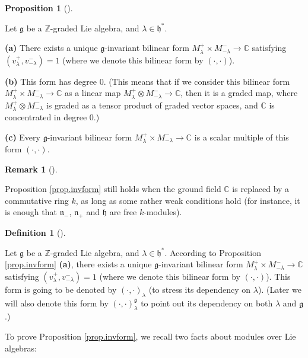 \documentclass
[numbers=enddot,12pt,final,onecolumn,german,notitlepage]{scrartcl}%
\theoremstyle{definition}
\newtheorem{prop}[theo]{Proposition}
\newenvironment{proposition}[1][]
{\begin{prop}[#1]\begin{leftbar}}
{\end{leftbar}\end{prop}}
\newtheorem{defi}[theo]{Definition}
\newenvironment{definition}[1][]
{\begin{defi}[#1]\begin{leftbar}}
{\end{leftbar}\end{defi}}
\newtheorem{remk}[theo]{Remark}
\newenvironment{remark}[1][]
{\begin{remk}[#1]\begin{leftbar}}
{\end{leftbar}\end{remk}}
\begin{document}
\begin{proposition}
\label{prop.invform}Let $\mathfrak{g}$ be a $\mathbb{Z}$-graded Lie algebra,
and $\lambda\in\mathfrak{h}^{\ast}$.

\textbf{(a)} There exists a unique $\mathfrak{g}$-invariant bilinear form
$M_{\lambda}^{+}\times M_{-\lambda}^{-}\rightarrow\mathbb{C}$ satisfying
$\left(  v_{\lambda}^{+},v_{-\lambda}^{-}\right)  =1$ (where we denote this
bilinear form by $\left(  \cdot,\cdot\right)  $).

\textbf{(b)} This form has degree $0$. (This means that if we consider this
bilinear form $M_{\lambda}^{+}\times M_{-\lambda}^{-}\rightarrow\mathbb{C}$ as
a linear map $M_{\lambda}^{+}\otimes M_{-\lambda}^{-}\rightarrow\mathbb{C}$,
then it is a graded map, where $M_{\lambda}^{+}\otimes M_{-\lambda}^{-}$ is
graded as a tensor product of graded vector spaces, and $\mathbb{C}$ is
concentrated in degree $0$.)

\textbf{(c)} Every $\mathfrak{g}$-invariant bilinear form $M_{\lambda}%
^{+}\times M_{-\lambda}^{-}\rightarrow\mathbb{C}$ is a scalar multiple of this
form $\left(  \cdot,\cdot\right)  $.
\end{proposition}

\begin{remark}
\label{rmk.invform.1}Proposition \ref{prop.invform} still holds when the
ground field $\mathbb{C}$ is replaced by a commutative ring $k$, as long as
some rather weak conditions hold (for instance, it is enough that
$\mathfrak{n}_{-}$, $\mathfrak{n}_{+}$ and $\mathfrak{h}$ are free $k$-modules).
\end{remark}

\begin{definition}
\label{def.invform}Let $\mathfrak{g}$ be a $\mathbb{Z}$-graded Lie algebra,
and $\lambda\in\mathfrak{h}^{\ast}$. According to Proposition
\ref{prop.invform} \textbf{(a)}, there exists a unique $\mathfrak{g}%
$-invariant bilinear form $M_{\lambda}^{+}\times M_{-\lambda}^{-}%
\rightarrow\mathbb{C}$ satisfying $\left(  v_{\lambda}^{+},v_{-\lambda}%
^{-}\right)  =1$ (where we denote this bilinear form by $\left(  \cdot
,\cdot\right)  $). This form is going to be denoted by $\left(  \cdot
,\cdot\right)  _{\lambda}$ (to stress its dependency on $\lambda$). (Later we
will also denote this form by $\left(  \cdot,\cdot\right)  _{\lambda
}^{\mathfrak{g}}$ to point out its dependency on both $\lambda$ and
$\mathfrak{g}$.)
\end{definition}

To prove Proposition \ref{prop.invform}, we recall two facts about modules
over Lie algebras:
\end{document}
